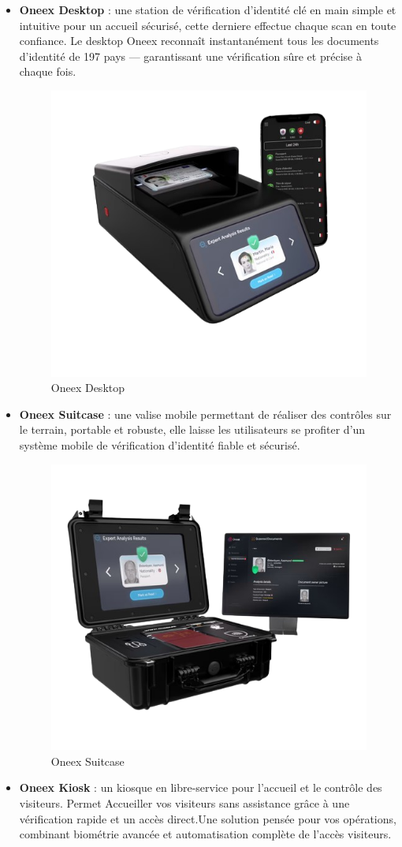 \begin{itemize}
	\item \textbf{Oneex Desktop} : une station de vérification d’identité clé en main simple et intuitive pour un accueil sécurisé, cette derniere effectue chaque scan en toute confiance. Le desktop Oneex reconnaît instantanément tous les documents d'identité de 197 pays — garantissant une vérification sûre et précise à chaque fois.
	      \begin{figure} [H]
		      \centering
		      \includegraphics[width=.5\textwidth]{figures/Oneex desktop.png}
		      \caption{Oneex Desktop}
	      \end{figure}
	\item \textbf{Oneex Suitcase} : une valise mobile permettant de réaliser des contrôles sur le terrain, portable et robuste, elle laisse les utilisateurs se profiter d’un système mobile de vérification d’identité fiable et sécurisé.
	      \begin{figure} [H]
		      \centering
		      \includegraphics[width=.5\textwidth]{figures/Oneex suitcase.png}
		      \caption{Oneex Suitcase}
	      \end{figure}
	\item \textbf{Oneex Kiosk} : un kiosque en libre-service pour l’accueil et le contrôle des visiteurs. Permet Accueiller vos visiteurs sans assistance grâce à une vérification rapide et un accès direct.Une solution pensée pour vos opérations, combinant biométrie avancée et automatisation complète de l’accès visiteurs.

\end{itemize}
